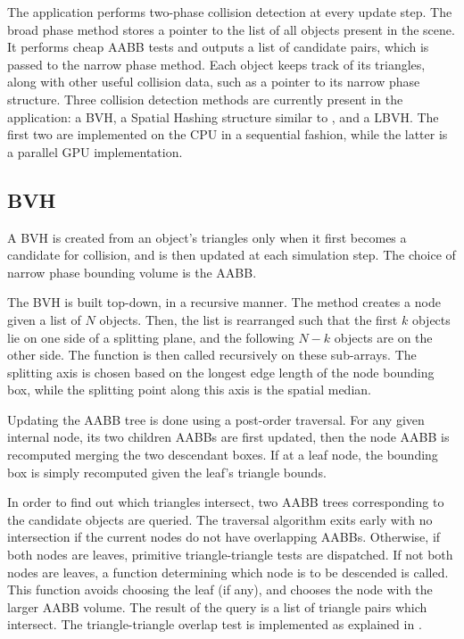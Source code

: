 The application performs two-phase collision detection at every update step. The broad phase method stores a pointer to the list of all objects present in the scene. It performs cheap AABB tests and outputs a list of candidate pairs, which is passed to the narrow phase method. Each object keeps track of its triangles, along with other useful collision data, such as a pointer to its narrow phase structure. Three collision detection methods are currently present in the application: a BVH, a Spatial Hashing structure similar to \citep{thm03}, and a LBVH. The first two are implemented on the CPU in a sequential fashion, while the latter is a parallel GPU implementation. 

\subsection{BVH}
\label{sub-sec:bvh}

A BVH is created from an object's triangles only when it first becomes a candidate for collision, and is then updated at each simulation step. The choice of narrow phase bounding volume is the AABB.

The BVH is built top-down, in a recursive manner. The method creates a node given a list of $N$ objects. Then, the list is rearranged such that the first $k$ objects lie on one side of a splitting plane, and the following $N - k$ objects are on the other side. The function is then called recursively on these sub-arrays. The splitting axis is chosen based on the longest edge length of the node bounding box, while the splitting point along this axis is the spatial median. 

Updating the AABB tree is done using a post-order traversal. For any given internal node, its two children AABBs are first updated, then the node AABB is recomputed merging the two descendant boxes. If at a leaf node, the bounding box is simply recomputed given the leaf's triangle bounds. 

In order to find out which triangles intersect, two AABB trees corresponding to the candidate objects are queried. The traversal algorithm exits early with no intersection if the current nodes do not have overlapping AABBs. Otherwise, if both nodes are leaves, primitive triangle-triangle tests are dispatched. If not both nodes are leaves, a function determining which node is to be descended is called. This function avoids choosing the leaf (if any), and chooses the node with the larger AABB volume. The result of the query is a list of triangle pairs which intersect. The triangle-triangle overlap test is implemented as explained in \citep{moller97}.

